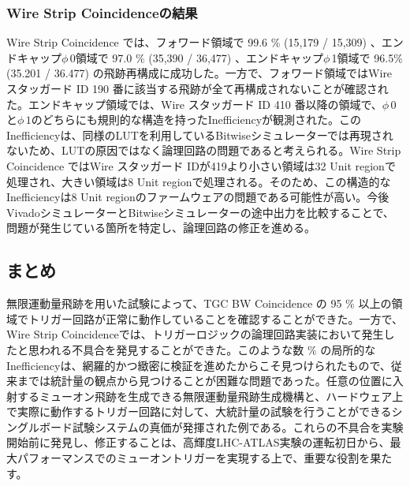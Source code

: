 \subsubsection*{Wire Strip Coincidenceの結果}
Wire Strip Coincidence では、フォワード領域で 99.6 \% (15,179 / 15,309) 、エンドキャップ$\phi\,$0領域で 97.0 \% (35,390 / 36,477) 、エンドキャップ$\phi\,$1領域で 96.5\% (35.201 / 36.477) の飛跡再構成に成功した。一方で、フォワード領域ではWire スタッガード ID 190 番に該当する飛跡が全て再構成されないことが確認された。エンドキャップ領域では、Wire スタッガード ID 410 番以降の領域で、$\phi\,0$と$\phi\,1$のどちらにも規則的な構造を持ったInefficiencyが観測された。このInefficiencyは、同様のLUTを利用しているBitwiseシミュレーターでは再現されないため、LUTの原因ではなく論理回路の問題であると考えられる。Wire Strip Coincidence ではWire スタッガード IDが419より小さい領域は32 Unit regionで処理され、大きい領域は8 Unit regionで処理される。そのため、この構造的なInefficiencyは8 Unit regionのファームウェアの問題である可能性が高い。今後VivadoシミュレーターとBitwiseシミュレーターの途中出力を比較することで、問題が発生じている箇所を特定し、論理回路の修正を進める。

\subsection{まとめ}
無限運動量飛跡を用いた試験によって、TGC BW Coincidence の 95 \% 以上の領域でトリガー回路が正常に動作していることを確認することができた。一方で、Wire Strip Coincidenceでは、トリガーロジックの論理回路実装において発生したと思われる不具合を発見することができた。このような数 \% の局所的なInefficiencyは、網羅的かつ緻密に検証を進めたからこそ見つけられたもので、従来までは統計量の観点から見つけることが困難な問題であった。任意の位置に入射するミューオン飛跡を生成できる無限運動量飛跡生成機構と、ハードウェア上で実際に動作するトリガー回路に対して、大統計量の試験を行うことができるシングルボード試験システムの真価が発揮された例である。これらの不具合を実験開始前に発見し、修正することは、高輝度LHC-ATLAS実験の運転初日から、最大パフォーマンスでのミューオントリガーを実現する上で、重要な役割を果たす。

